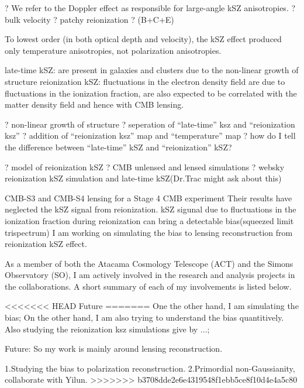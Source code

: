\documentclass[12pt, notitlepage, onecolumn, amsmath, amssymb, aps]{revtex4-1}
\begin{document}
? We refer to the Doppler effect as responsible for large-angle kSZ anisotropies.
? bulk velocity
? patchy reionization
? (B+C+E)


To lowest order (in both optical depth and velocity), the kSZ effect produced only temperature anisotropies, not polarization anisotropies. 



late-time kSZ: are present in galaxies and clusters due to the non-linear growth of structure
reionization kSZ: fluctuations in the electron density field are due to fluctuations in the ionization fraction, are also expected to be correlated with the matter density field and hence with CMB lensing. 

? non-linear growth of structure
? seperation of ``late-time'' ksz and ``reionization ksz''
? addition of ``reionization ksz'' map and ``temperature'' map
? how do I tell the difference between ``late-time'' kSZ and ``reionization'' kSZ?

? model of reionization kSZ
? CMB unlensed and lensed simulations
? websky reionization kSZ simulation and late-time kSZ(Dr.Trac might ask about this)

CMB-S3 and CMB-S4 lensing 
for a Stage 4 CMB experiment
Their results have neglected the kSZ signal from reionization. 
kSZ sigunal due to fluctuations in the ionization fraction during reionization can bring a detectable bias(squeezed limit trispectrum)
I am working on simulating the bias to lensing reconstruction from reionization kSZ effect. 


As a member of both the Atacama Cosmology Telescope (ACT) and the
Simons Observatory (SO), I am actively involved in the research and
analysis projects in the collaborations. A short summary of each of my
involvements is listed below.

<<<<<<< HEAD
Future
=======
One the other hand, I am simulating the bias; On the other hand, I am also trying to understand the bias quantitively. Also studying the reionization  ksz simulations give by ...;

Future:
So my work is mainly around lensing reconstruction.

1.Studying the bias to polarization reconstruction.
2.Primordial non-Gaussianity, collaborate with Yilun.
>>>>>>> b3708dde2e6e4319548f1ebb5ce8f10d4e4a5c80


\end{document}
